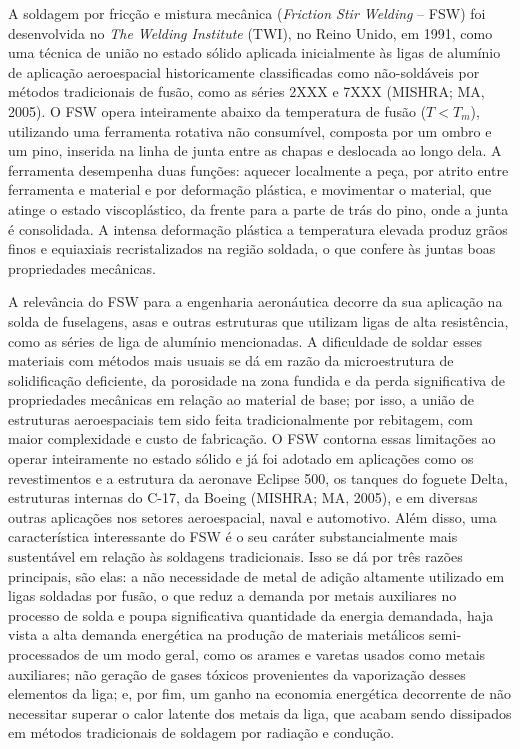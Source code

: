 \documentclass[12pt,openany]{report}
\begin{document}
A soldagem por fricção e mistura mecânica (\textit{Friction Stir Welding} -- FSW) foi desenvolvida no \textit{The Welding Institute} (TWI), no Reino Unido, em 1991, como uma técnica de união no estado sólido aplicada inicialmente às ligas de alumínio de aplicação aeroespacial historicamente classificadas como não-soldáveis por métodos tradicionais de fusão, como as séries 2XXX e 7XXX (MISHRA; MA, 2005). O FSW opera inteiramente abaixo da temperatura de fusão ($T < T_m$), utilizando uma ferramenta rotativa não consumível, composta por um ombro e um pino, inserida na linha de junta entre as chapas e deslocada ao longo dela. A ferramenta desempenha duas funções: aquecer localmente a peça, por atrito entre ferramenta e material e por deformação plástica, e movimentar o material, que atinge o estado viscoplástico, da frente para a parte de trás do pino, onde a junta é consolidada.  A intensa deformação plástica a temperatura elevada produz grãos finos e equiaxiais recristalizados na região soldada, o que confere às juntas boas propriedades mecânicas.


A relevância do FSW para a engenharia aeronáutica decorre da sua aplicação na solda de fuselagens, asas e outras estruturas que utilizam ligas de alta resistência, como as séries de liga de alumínio mencionadas. A dificuldade de soldar esses materiais com métodos mais usuais se dá em razão da microestrutura de solidificação deficiente, da porosidade na zona fundida e da perda significativa de propriedades mecânicas em relação ao material de base; por isso, a união de estruturas aeroespaciais tem sido feita tradicionalmente por rebitagem, com maior complexidade e custo de fabricação. O FSW contorna essas limitações ao operar inteiramente no estado sólido e já foi adotado em aplicações como os revestimentos e a estrutura da aeronave Eclipse 500, os tanques do foguete Delta, estruturas internas do C-17, da Boeing (MISHRA; MA, 2005), e em diversas outras aplicações nos setores aeroespacial, naval e automotivo. Além disso, uma característica interessante do FSW é o seu caráter substancialmente mais sustentável em relação às soldagens tradicionais. Isso se dá por três razões principais, são elas: a não necessidade de metal de adição altamente utilizado em ligas soldadas por fusão, o que reduz a demanda por metais auxiliares no processo de solda e poupa significativa quantidade da energia demandada, haja vista a alta demanda energética na produção de materiais metálicos semi-processados de um modo geral, como os arames e varetas usados como metais auxiliares; não geração de gases tóxicos provenientes da vaporização desses elementos da liga; e, por fim, um ganho na economia energética decorrente de não necessitar superar o calor latente dos metais da liga, que acabam sendo dissipados em métodos tradicionais de soldagem por radiação e condução.
\end{document}
